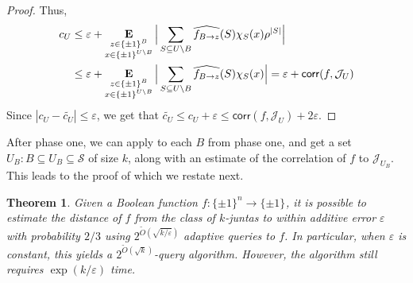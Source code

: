 \documentclass[10pt,a4paper]{article}
\theoremstyle{plain}
\newtheorem{theorem}{Theorem}[section]
\theoremstyle{remark}
\theoremstyle{plain}
\providecommand{\E}{}
\renewcommand{\E}{\mathop{\bf E\/}}
\newcommand{\eps}{\varepsilon}
\renewcommand{\hat}{\widehat}
\renewcommand{\tilde}{\widetilde}
\newcommand{\pmone}{\{\pm 1\}}
\newcommand{\calJ}{\mathcal{J}}
\newcommand{\calS}{\mathcal{S}}
\newcommand{\InfluentialCoords}{\calS}
\newcommand{\BooleanHypercube}[1]{\{\pm 1\}^{#1}}
\newcommand{\corr}{\mathsf{corr}}
\renewcommand{\epsilon}{\varepsilon}
\begin{document}
\begin{proof}
Thus,
     \begin{align*}
     c_U  &\le \eps +   
     \E_{\substack{z \in \pmone^{B}\\x \in \pmone^{U \setminus B}}}
     \Big | \sum_{S \subseteq U\setminus B} \hat{f_{B \to z}}(S)\chi_S(x)\rho^{|S|}\Big| \nonumber \\
     &\le  \eps +
     \E_{\substack{z \in \pmone^{B}\\x \in \pmone^{U \setminus B}}}
     \Big | \sum_{S \subseteq U\setminus B} \hat{f_{B \to z}}(S)\chi_S(x)\Big|
      = \eps + 
     \corr(f, \calJ_U)\end{align*}
  Since $|c_U - \tilde{c_U}| \le \eps$, we get that  $\tilde{c_U} \le c_U + \eps \le \corr(f, \calJ_U) + 2\eps$.
\end{proof}



After phase one, we can apply  to each $B$ from phase one, and get a set $U_B: B \subseteq U_B \subseteq \InfluentialCoords$ of size $k$, along with an estimate of the correlation of $f$ to $\calJ_{U_B}$. This leads to the proof of  which we restate next.
\begin{theorem}
Given a Boolean function $f: \BooleanHypercube{n} \to \BooleanHypercube{}$, it is possible to estimate the distance of $f$ from the class of $k$-juntas to within additive error $\epsilon$ with probability $2/3$ using 
$ 2^{\tilde{O}(\sqrt{k/\eps})}$ adaptive queries to $f$. In particular, when $\epsilon$ is constant, this yields a $2^{\tilde{O}(\sqrt{k})}$-query algorithm. However, the algorithm still requires $\exp(k/\eps)$ time.
\end{theorem}
\end{document}
